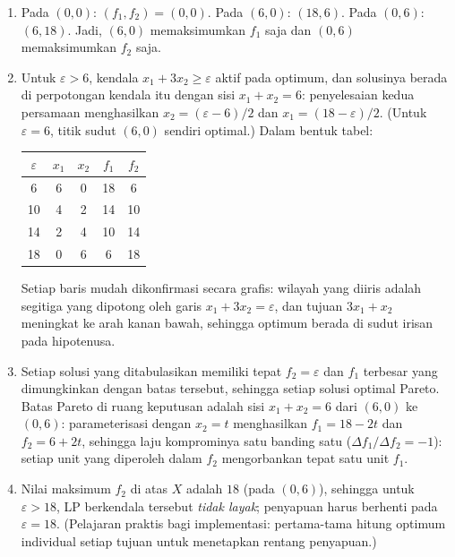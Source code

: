 
\begin{enumerate}
\item Pada $(0,0)$: $(f_1, f_2) = (0,0)$. Pada $(6,0)$: $(18, 6)$. Pada
$(0,6)$: $(6, 18)$. Jadi, $(6,0)$ memaksimumkan $f_1$ saja dan $(0,6)$
memaksimumkan $f_2$ saja.
\item Untuk $\varepsilon > 6$, kendala $x_1 + 3x_2 \geq \varepsilon$ aktif
pada optimum, dan solusinya berada di perpotongan kendala itu dengan sisi
$x_1 + x_2 = 6$: penyelesaian kedua persamaan menghasilkan
$x_2 = (\varepsilon - 6)/2$ dan $x_1 = (18 - \varepsilon)/2$. (Untuk
$\varepsilon = 6$, titik sudut $(6,0)$ sendiri optimal.) Dalam bentuk tabel:
\begin{center}
\begin{tabular}{c|cccc}
$\varepsilon$ & $x_1$ & $x_2$ & $f_1$ & $f_2$ \\\hline
6  & 6 & 0 & 18 & 6 \\
10 & 4 & 2 & 14 & 10 \\
14 & 2 & 4 & 10 & 14 \\
18 & 0 & 6 & 6  & 18 \\
\end{tabular}
\end{center}
Setiap baris mudah dikonfirmasi secara grafis: wilayah yang diiris adalah
segitiga yang dipotong oleh garis $x_1 + 3x_2 = \varepsilon$, dan tujuan
$3x_1 + x_2$ meningkat ke arah kanan bawah, sehingga optimum berada di sudut
irisan pada hipotenusa.
\item Setiap solusi yang ditabulasikan memiliki tepat $f_2 = \varepsilon$ dan
$f_1$ terbesar yang dimungkinkan dengan batas tersebut, sehingga setiap solusi
optimal Pareto. Batas Pareto di ruang keputusan adalah sisi $x_1 + x_2 = 6$
dari $(6,0)$ ke $(0,6)$: parameterisasi dengan $x_2 = t$ menghasilkan
$f_1 = 18 - 2t$ dan $f_2 = 6 + 2t$, sehingga laju komprominya satu banding satu
($\Delta f_1 / \Delta f_2 = -1$): setiap unit yang diperoleh dalam $f_2$
mengorbankan tepat satu unit $f_1$.
\item Nilai maksimum $f_2$ di atas $X$ adalah $18$ (pada $(0,6)$), sehingga
untuk $\varepsilon > 18$, LP berkendala tersebut \emph{tidak layak}; penyapuan
harus berhenti pada $\varepsilon = 18$. (Pelajaran praktis bagi implementasi:
pertama-tama hitung optimum individual setiap tujuan untuk menetapkan rentang
penyapuan.)
\end{enumerate}

